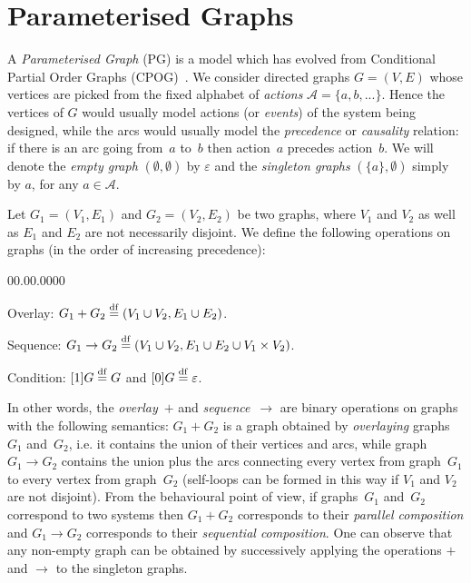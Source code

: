 \label{chap:PGAlgebra}

\section{Parameterised Graphs\label{sec:Parametrised-Graphs}}

A \emph{Parameterised Graph} (PG) is a model which has evolved from
Conditional Partial Order Graphs (CPOG)~\cite{2010_mokhov_ieee}.
We consider directed graphs $G=(V,E)$ whose vertices are picked from
the fixed alphabet of \emph{actions} $\mathcal{A}=\{a,b,...\}$. Hence
the vertices of $G$ would usually model actions (or \emph{events})
of the system being designed, while the arcs would usually model the
\emph{precedence} or \emph{causality} relation: if there is an arc
going from~$a$ to~$b$ then action~$a$ precedes action~$b$.
We will denote the \emph{empty graph} $(\emptyset,\emptyset)$ by
$\varepsilon$ and the \emph{singleton graphs} $(\{a\},\emptyset)$
simply by $a$, for any $a\in\mathcal{A}$.

Let $G_{1}=(V_{1},E_{1})$ and $G_{2}=(V_{2},E_{2})$ be two graphs,
where $V_{1}$ and $V_{2}$ as well as $E_{1}$ and $E_{2}$ are not
necessarily disjoint. We define the following operations on graphs
(in the order of increasing precedence):
\begin{lyxlist}{00.00.0000}
\item [{\hspace{6mm}Overlay:}] $G_{1}+G_{2}\overset{\mathrm{df}}{=}(V_{1}\cup V_{2},E_{1}\cup E_{2})$.
\item [{\hspace{6mm}Sequence:}] $G_{1}\rightarrow G_{2}\overset{\mathrm{df}}{=}(V_{1}\cup V_{2},E_{1}\cup E_{2}\cup V_{1}\times V_{2})$.
\item [{\hspace{6mm}Condition:}] $[1]G\overset{\mathrm{df}}{=} G$ and
$[0]G\overset{\mathrm{df}}{=}\varepsilon$.
\end{lyxlist}
In other words, the \emph{overlay}~$+$ and \emph{sequence}~$\rightarrow$
are binary operations on graphs with the following semantics: $G_{1}+G_{2}$
is a graph obtained by \emph{overlaying} graphs~$G_{1}$ and~$G_{2}$,
i.e. it contains the union of their vertices and arcs, while graph
$G_{1}\rightarrow G_{2}$ contains the union plus the arcs connecting
every vertex from graph~$G_{1}$ to every vertex from graph~$G_{2}$
(self-loops can be formed in this way if $V_{1}$ and $V_{2}$ are
not disjoint). From the behavioural point of view, if graphs~$G_{1}$
and~$G_{2}$ correspond to two systems then $G_{1}+G_{2}$ corresponds
to their \emph{parallel composition} and $G_{1}\rightarrow G_{2}$
corresponds to their \emph{sequential composition}. One can observe
that any non-empty graph can be obtained by successively applying
the operations $+$ and $\rightarrow$ to the singleton graphs.


